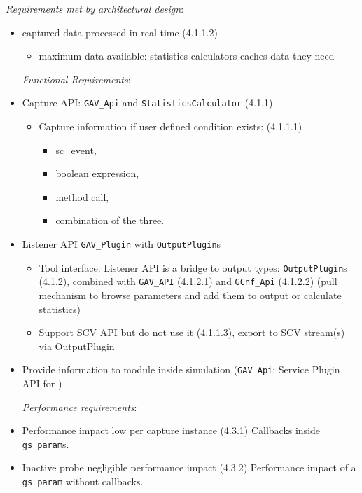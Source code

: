 {\em Requirements met by architectural design}:
\begin{itemize}
  \item captured data processed in real-time (4.1.1.2)
  \begin{itemize}
    \item maximum data available: statistics calculators caches data they need
  \end{itemize}

{\em Functional Requirements}:
  \item Capture API: \verb|GAV_Api| and \verb|StatisticsCalculator| (4.1.1)
  \begin{itemize}
    \item Capture information if user defined condition exists: (4.1.1.1)
    \begin{itemize}
      \item sc\_event,
      \item boolean expression,
      \item method call,
      \item combination of the three.
    \end{itemize}
  \end{itemize}

  \item Listener API \verb|GAV_Plugin| with \verb|OutputPlugin|s
  \begin{itemize}
    \item Tool interface: Listener API is a bridge to output types: \verb|OutputPlugin|s (4.1.2), combined with \verb|GAV_API| (4.1.2.1) and \verb|GCnf_Api| (4.1.2.2) (pull mechanism to browse parameters and add them to output or calculate statistics)
    \item Support SCV API but do not use it (4.1.1.3), export to SCV stream(s) via OutputPlugin
  \end{itemize}

  \item Provide information to module inside simulation (\verb|GAV_Api|: Service Plugin API for \GreenControl)

{\em Performance requirements}:

  \item Performance impact low per capture instance (4.3.1) \newline
  	Callbacks inside \verb|gs_param|s.
  \item Inactive probe negligible performance impact (4.3.2) \newline
  	Performance impact of a \verb|gs_param| without callbacks.
\end{itemize}

